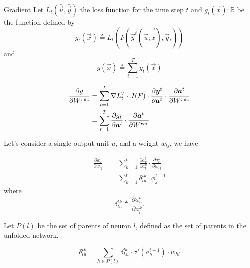 \begin{frame}{Gradient}
	Let $L_t(\bar{\vec{u}}, \bar{\vec{y}})$ the loss function for the time step $t$ and  $g_t(\vec{x}): \mathbb{R}$ be the function defined by
	$$g_t(\vec{x}) \triangleq L_t(F(\vec{y}^t(\vec{\bar{\vec{u}};x}),\bar{\vec{y}}_t ))$$
	and $$g(\vec{x}) \triangleq \sum_{t=1}^T g_t(\vec{x})$$
	
	
	\begin{align}
	\frac{\partial g}{\partial W^{rec}} &= \sum_{t=1}^T \nabla L_t^T \cdot J(F) \cdot \frac{\partial \boldsymbol{y}^t}{\partial \boldsymbol{a}^t} \cdot \frac{\partial \boldsymbol{a}^t}{\partial W^{rec}}\\
	&= \sum_{t=1}^T\frac{\partial g_t}{\partial \boldsymbol{a}^t} \cdot \frac{\partial \boldsymbol{a}^t}{\partial W^{rec}}
	\end{align}
\end{frame}
\begin{frame}
	
	Let's consider a single output unit $u$, and a weight $w_{lj}$, we have
	
	\begin{align}
	\label{sum_over_time}
	\frac{\partial a^t_u}{\partial w_{lj}} &= \sum_{k=1}^t \frac{\partial a_u^t}{\partial a^k_l} \cdot \frac{\partial a^k_l}{\partial w_{lj}}\\
	&= \sum_{k=1}^t \delta^{tk}_{lu} \cdot \phi_j^{t-1}
	\end{align}
	where
	\begin{equation}
	\delta_{lu}^{tk} \triangleq \frac{\partial a_u^t}{\partial a^k_l}.
	\end{equation}
	
	Let $P(l)$ be the set of parents of neuron $l$, defined as the set of parents in the unfolded network.
	
	\begin{equation}
	\delta_{lu}^{tk} = \sum_{h\in P(l)} \delta_{hu}^{tk} \cdot \sigma'(a_h^{t-1})\cdot w_{hl}
	\end{equation}
\end{frame}
